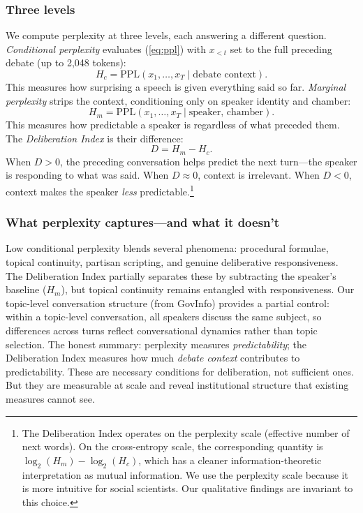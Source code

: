 \documentclass[12pt]{article}
\newcommand{\Hc}{H_c}
\newcommand{\Hm}{H_m}
\newcommand{\DI}{\mathit{D}}
\newcommand{\PPL}{\text{PPL}}
\begin{document}
\subsubsection*{Three levels}
We compute perplexity at three levels, each answering a different question. \textit{Conditional perplexity} evaluates (\ref{eq:ppl}) with $x_{<t}$ set to the full preceding debate (up to 2,048 tokens):
\begin{equation}
\Hc = \PPL(x_1, \ldots, x_T \mid \text{debate context}).
\end{equation}
This measures how surprising a speech is given everything said so far. \textit{Marginal perplexity} strips the context, conditioning only on speaker identity and chamber:
\begin{equation}
\Hm = \PPL(x_1, \ldots, x_T \mid \text{speaker, chamber}).
\end{equation}
This measures how predictable a speaker is regardless of what preceded them. The \textit{Deliberation Index} is their difference:
\begin{equation}
\DI = \Hm - \Hc.
\label{eq:di}
\end{equation}
When $\DI > 0$, the preceding conversation helps predict the next turn---the speaker is responding to what was said. When $\DI \approx 0$, context is irrelevant. When $\DI < 0$, context makes the speaker \textit{less} predictable.\footnote{The Deliberation Index operates on the perplexity scale (effective number of next words). On the cross-entropy scale, the corresponding quantity is $\log_2(\Hm) - \log_2(\Hc)$, which has a cleaner information-theoretic interpretation as mutual information. We use the perplexity scale because it is more intuitive for social scientists. Our qualitative findings are invariant to this choice.}

\subsubsection*{What perplexity captures---and what it doesn't}
Low conditional perplexity blends several phenomena: procedural formulae, topical continuity, partisan scripting, and genuine deliberative responsiveness. The Deliberation Index partially separates these by subtracting the speaker's baseline ($\Hm$), but topical continuity remains entangled with responsiveness. Our topic-level conversation structure (from GovInfo) provides a partial control: within a topic-level conversation, all speakers discuss the same subject, so differences across turns reflect conversational dynamics rather than topic selection. The honest summary: perplexity measures \textit{predictability}; the Deliberation Index measures how much \textit{debate context} contributes to predictability. These are necessary conditions for deliberation, not sufficient ones. But they are measurable at scale and reveal institutional structure that existing measures cannot see.
\end{document}

